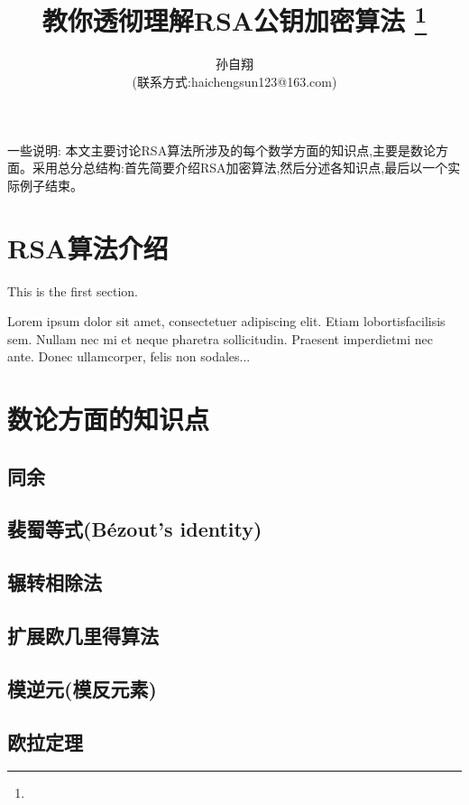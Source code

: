 \documentclass{article}
\title{\huge{教你透彻理解RSA公钥加密算法} \thanks{}}
\author{孙自翔\\[2pt]
\normalsize
(联系方式:haichengsun123@163.com) \\[2pt]}
\date{}  %
\begin{document}
\maketitle

% 
一些说明: 本文主要讨论RSA算法所涉及的每个数学方面的知识点,主要是数论方面。采用总分总结构:首先简要介绍RSA加密算法,然后分述各知识点,最后以一个实际例子结束。
 
 
\section{RSA算法介绍}
 
This is the first section.
 
Lorem  ipsum  dolor  sit  amet,  consectetuer  adipiscing  
elit.   Etiam  lobortisfacilisis sem.  Nullam nec mi et 
neque pharetra sollicitudin.  Praesent imperdietmi nec ante. 
Donec ullamcorper, felis non sodales...
 
\section{数论方面的知识点}
\subsection{同余}   
\subsection{裴蜀等式(Bézout's identity)}   
\subsection{辗转相除法}   
\subsection{扩展欧几里得算法}   
\subsection{模逆元(模反元素)}   
\subsection{欧拉定理}   
\end{document}
